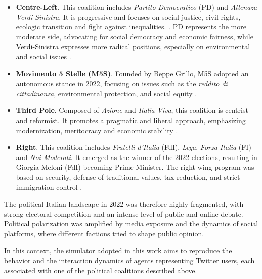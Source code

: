 \begin{itemize}
    \item \textbf{Centre-Left}. This coalition includes \textit{Partito Democratico} (PD) and \textit{Allenaza Verdi-Sinistra}. It is progressive and focuses on social justice, civil rights, ecologic transition and fight against inequalities. \cite{wired2022elezioni12punti, ilpost2022partiti}.
    PD represents the more moderate side, advocating for social democracy and economic fairness, while Verdi-Sinistra expresses more radical positions, especially on environmental and social issues \cite{pierri2024drivers}.

    \item \textbf{Movimento 5 Stelle (M5S)}. Founded by Beppe Grillo, M5S adopted an autonomous stance in 2022, focusing on issues such as the \textit{reddito di cittadinanza}, environmental protection, and social equity \cite{pierri2023ita, wired2022elezioni12punti}.

    \item \textbf{Third Pole}. Composed of \textit{Azione} and \textit{Italia Viva}, this coalition is centrist and reformist. 
    It promotes a pragmatic and liberal approach, emphasizing modernization, meritocracy and economic stability \cite{pierri2024drivers, ilpost2022partiti}.

    \item \textbf{Right}. This coalition includes \textit{Fratelli d'Italia} (FdI), \textit{Lega}, \textit{Forza Italia} (FI) and \textit{Noi Moderati}.
    It emerged as the winner of the 2022 elections, resulting in Giorgia Meloni (FdI) becoming Prime Minister.
    The right-wing program was based on security, defense of traditional values, tax reduction, and strict immigration control \cite{wired2022elezioni12punti, ilpost2022partiti, pagellapolitica2022confronto}.
\end{itemize}

The political Italian landscape in 2022 was therefore highly fragmented, with strong electoral competition and an intense level of public and online debate.
Political polarization was amplified by media exposure and the dynamics of social platforms, where different factions tried to shape public opinion.

\medskip
In this context, the simulator adopted in this work aims to reproduce the behavior and the interaction dynamics of agents representing Twitter users, each associated with one of the political coalitions described above.
